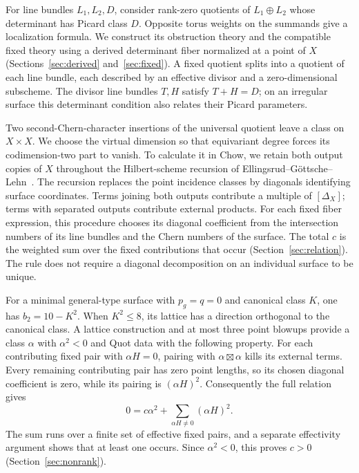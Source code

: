For line bundles $L_1,L_2,D$, consider rank-zero quotients of
$L_1\oplus L_2$ whose determinant has Picard class $D$.
Opposite torus weights on the summands give a localization formula.
We construct its obstruction theory and the compatible fixed theory
using a derived determinant fiber normalized at a point of $X$
(Sections~\ref{sec:derived} and~\ref{sec:fixed}). A fixed quotient
splits into a quotient of each line bundle, each described by an effective
divisor and a zero-dimensional subscheme. The divisor line bundles
$T,H$ satisfy $T+H=D$; on an irregular surface this determinant
condition also relates their Picard parameters.

Two second-Chern-character insertions of the universal quotient leave
a class on $X\times X$. We choose the virtual dimension so that
equivariant degree forces its codimension-two part to vanish. To calculate it in Chow, we retain both output copies
of $X$ throughout the Hilbert-scheme recursion of
Ellingsrud--G\"ottsche--Lehn~\cite{EGL}. The recursion replaces the
point incidence classes by diagonals identifying surface coordinates.
Terms joining both outputs contribute a multiple of $[\Delta_X]$;
terms with separated outputs contribute external products. For each
fixed fiber expression, this procedure chooses its diagonal coefficient
from the intersection numbers of its line bundles and the Chern
numbers of the surface. The total $c$ is the weighted sum over the
fixed contributions that occur (Section~\ref{sec:relation}). The rule
does not require a diagonal decomposition on an individual surface
to be unique.

For a minimal general-type surface with $p_g=q=0$ and canonical
class $K$, one has $b_2=10-K^2$. When $K^2\le8$, its lattice has a direction orthogonal
to the canonical class. A lattice construction and at most three
point blowups provide a class $\alpha$ with $\alpha^2<0$ and Quot
data with the following property. For each contributing fixed pair
with $\alpha H=0$, pairing with $\alpha\boxtimes\alpha$ kills
its external terms. Every remaining contributing pair has zero
point lengths, so its chosen
diagonal coefficient is zero, while its pairing is $(\alpha H)^2$.
Consequently the full relation gives
\[
 0=c\alpha^2+\sum_{\alpha H\ne0}(\alpha H)^2.
\]
The sum runs over a finite set of effective fixed pairs, and a separate
effectivity argument shows that at least one occurs. Since
$\alpha^2<0$, this proves $c>0$ (Section~\ref{sec:nonrank}).

